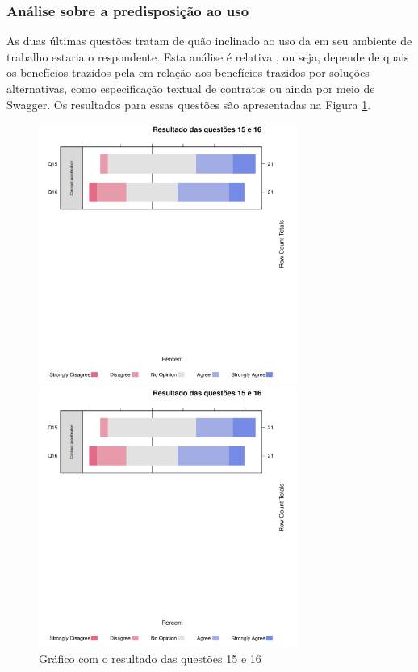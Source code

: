 \subsubsection{Análise sobre a predisposição ao uso}

As duas últimas questões tratam de quão inclinado ao uso da \neoidl{} em seu
ambiente de trabalho estaria o respondente.
Esta análise é relativa \cite{laitenberger1998evaluating}, ou seja, depende de
quais os benefícios trazidos pela \neoidl{} em relação aos benefícios trazidos por soluções alternativas, como
especificação textual de contratos ou ainda por meio de Swagger. Os resultados
para essas questões são apresentadas na Figura \ref{Respostas15e16}.

\begin{figure}[!htb]
\centering
\includegraphics[width=85mm,trim = 6mm 115mm 6mm 
10mm,clip]{img/GraficoResultadoQuestoes15e16.pdf}

\includegraphics[width=85mm,trim = 6mm 0mm 6mm 
170mm,clip]{img/GraficoResultadoQuestoes15e16.pdf}

\caption{Gráfico com o resultado das questões 15 e 16}
\label{Respostas15e16}
\end{figure}

